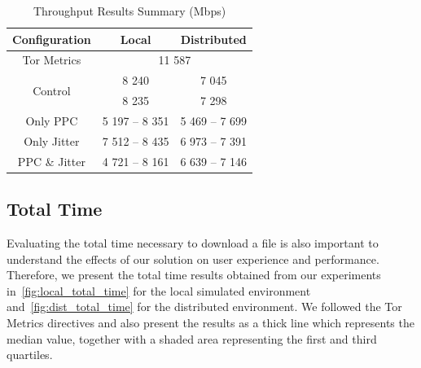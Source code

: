 \begin{table}[htbp]
    \centering
    \begin{tabular}{|c|c|c|}
    \hline
    \textbf{Configuration} & \textbf{Local} & \textbf{Distributed} \\
    \hline
    Tor Metrics& \multicolumn{2}{c|}{11 587} \\ 
    \hline
    \multirow{2}{*}{Control} & 8 240 & 7 045\\ 
    & 8 235 & 7 298\\
    \hline
    Only PPC & 5 197 – 8 351 & 5 469 – 7 699\\
    \hline
    Only Jitter & 7 512 – 8 435 & 6 973 – 7 391\\
    \hline
    PPC \& Jitter & 4 721 – 8 161 & 6 639 – 7 146\\
    \hline
    \end{tabular}
    \caption{Throughput Results Summary (Mbps)}\label{tab:throughput_summary}
\end{table}

\FloatBarrier
\subsection{Total Time}

Evaluating the total time necessary to download a file is also important to understand the effects of our solution on user experience and performance. Therefore, we present the total time results obtained from our experiments in~\autoref{fig:local_total_time} for the local simulated environment and~\autoref{fig:dist_total_time} for the distributed environment. We followed the Tor Metrics directives and also present the results as a thick line which represents the median value, together with a shaded area representing the first and third quartiles.

